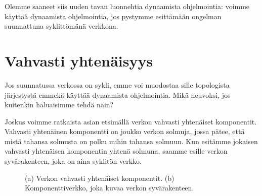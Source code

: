 Olemme saaneet siis uuden tavan luonnehtia dynaamista ohjelmointia:
voimme käyttää dynaamista ohjelmointia,
jos pystymme esittämään ongelman suunnattuna syklittömänä verkkona.

\section{Vahvasti yhtenäisyys}

Jos suunnatussa verkossa on sykli,
emme voi muodostaa sille topologista järjestystä
emmekä käyttää dynaamista ohjelmointia.
Mikä neuvoksi, jos kuitenkin haluaisimme tehdä näin?

Joskus voimme ratkaista asian etsimällä
verkon vahvasti yhtenäiset komponentit.
Vahvasti yhtenäinen komponentti on joukko verkon solmuja,
jossa pätee, että mistä tahansa solmusta on polku
mihin tahansa solmuun.
Kun esitämme jokaisen vahvasti yhtenäisen komponentin
yhtenä solmuna, saamme esille verkon syvärakenteen,
joka on aina syklitön verkko.

\begin{figure}
\center
\begin{center}
\end{center}
\caption{(a) Verkon vahvasti yhtenäiset komponentit.
(b) Komponenttiverkko, joka kuvaa verkon syvärakenteen.}
\label{fig:vahkom}
\end{figure}

